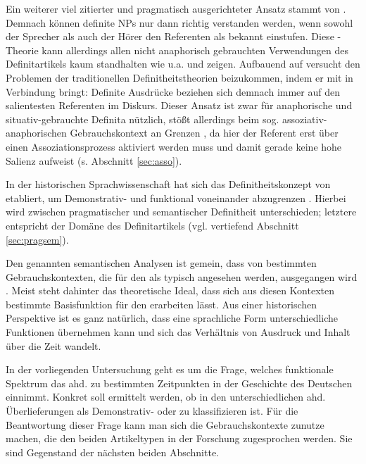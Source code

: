 Ein weiterer viel zitierter und pragmatisch ausgerichteter Ansatz stammt von \textcite{Christophersen1939}. Demnach können definite NPs  nur dann richtig verstanden werden, wenn sowohl der Sprecher als auch der Hörer den Referenten als bekannt einstufen. Diese -Theorie kann allerdings allen nicht anaphorisch  gebrauchten Verwendungen des Definitartikels  kaum standhalten wie u.a. \textcite{Hawkins1978} und \textcite{Lobner1985} zeigen. Aufbauend auf \textcite{Lewis1970} versucht \textcite{vonHeusinger1996} den Problemen der traditionellen Definitheitstheorien beizukommen, indem er  mit  in Verbindung bringt: Definite Ausdrücke beziehen sich demnach immer auf den salientesten Referenten im Diskurs. Dieser Ansatz ist zwar für anaphorische  und situativ-gebrauchte  Definita nützlich, stößt allerdings beim sog. assoziativ-anaphorischen  Gebrauchskontext an Grenzen \parencite[s. auch][144--149]{Cui2014}, da hier der Referent erst über einen Assoziationsprozess aktiviert werden muss und damit gerade keine hohe Salienz aufweist (s. Abschnitt \ref{sec:asso}).

In der historischen Sprachwissenschaft hat sich das Definitheitskonzept von \textcite{Lobner1985} etabliert, um Demonstrativ-  und  funktional voneinander abzugrenzen \parencite{Demske2001,Szczepaniak2011a,Schlachter2015}. Hierbei wird zwischen pragmatischer  und semantischer Definitheit  unterschieden; letztere entspricht der Domäne des Definitartikels (vgl. vertiefend Abschnitt \ref{sec:pragsem}). 

Den genannten  semantischen Analysen ist gemein, dass von bestimmten Gebrauchskontexten, die für den  als typisch angesehen werden, ausgegangen wird \parencite[9]{Cui2014}. Meist steht dahinter das theoretische Ideal, dass sich aus diesen Kontexten  bestimmte Basisfunktion für den  erarbeiten lässt. Aus einer historischen Perspektive ist es ganz natürlich, dass eine sprachliche Form unterschiedliche Funktionen übernehmen kann und sich das Verhältnis von Ausdruck und Inhalt über die Zeit wandelt. 

In der vorliegenden Untersuchung geht es um die Frage, welches funktionale Spektrum das ahd.  zu bestimmten Zeitpunkten in der Geschichte des Deutschen einnimmt. Konkret soll ermittelt werden, ob  in den unterschiedlichen ahd. Überlieferungen als Demonstrativ-  oder  zu klassifizieren ist. Für die Beantwortung dieser Frage kann man sich die Gebrauchskontexte  zunutze machen, die den beiden Artikeltypen in der Forschung zugesprochen werden. Sie sind Gegenstand der nächsten beiden Abschnitte. 



